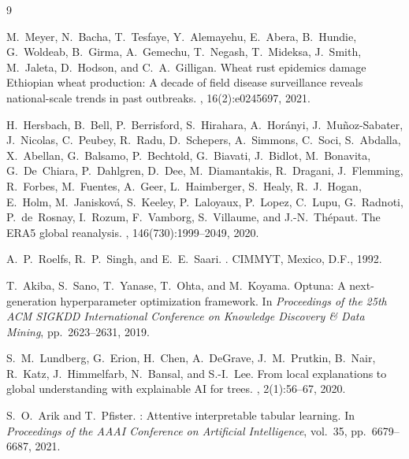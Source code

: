\documentclass[10pt,twocolumn,letterpaper]{article}
\begin{document}
{\small

\begin{thebibliography}{9}

M.~Meyer, N.~Bacha, T.~Tesfaye, Y.~Alemayehu, E.~Abera, B.~Hundie, G.~Woldeab, B.~Girma, A.~Gemechu, T.~Negash, T.~Mideksa, J.~Smith, M.~Jaleta, D.~Hodson, and C.~A.~Gilligan.
\newblock Wheat rust epidemics damage {E}thiopian wheat production: A decade of field disease surveillance reveals national-scale trends in past outbreaks.
, 16(2):e0245697, 2021.

H.~Hersbach, B.~Bell, P.~Berrisford, S.~Hirahara, A.~Hor\'{a}nyi, J.~Mu\~{n}oz-Sabater, J.~Nicolas, C.~Peubey, R.~Radu, D.~Schepers, A.~Simmons, C.~Soci, S.~Abdalla, X.~Abellan, G.~Balsamo, P.~Bechtold, G.~Biavati, J.~Bidlot, M.~Bonavita, G.~De~Chiara, P.~Dahlgren, D.~Dee, M.~Diamantakis, R.~Dragani, J.~Flemming, R.~Forbes, M.~Fuentes, A.~Geer, L.~Haimberger, S.~Healy, R.~J.~Hogan, E.~Holm, M.~Janiskov\'{a}, S.~Keeley, P.~Laloyaux, P.~Lopez, C.~Lupu, G.~Radnoti, P.~de~Rosnay, I.~Rozum, F.~Vamborg, S.~Villaume, and J.-N.~Th\'{e}paut.
\newblock The {ERA5} global reanalysis.
, 146(730):1999--2049, 2020.

A.~P.~Roelfs, R.~P.~Singh, and E.~E.~Saari.
.
\newblock CIMMYT, Mexico, D.F., 1992.

T.~Akiba, S.~Sano, T.~Yanase, T.~Ohta, and M.~Koyama.
\newblock Optuna: A next-generation hyperparameter optimization framework.
\newblock In {\em Proceedings of the 25th ACM SIGKDD International Conference on Knowledge Discovery \& Data Mining}, pp.\ 2623--2631, 2019.

S.~M.~Lundberg, G.~Erion, H.~Chen, A.~DeGrave, J.~M.~Prutkin, B.~Nair, R.~Katz, J.~Himmelfarb, N.~Bansal, and S.-I.~Lee.
\newblock From local explanations to global understanding with explainable {AI} for trees.
, 2(1):56--67, 2020.

S.~O.~Arik and T.~Pfister.
: Attentive interpretable tabular learning.
\newblock In {\em Proceedings of the AAAI Conference on Artificial Intelligence}, vol.\ 35, pp.\ 6679--6687, 2021.

\end{thebibliography}
}
\end{document}
